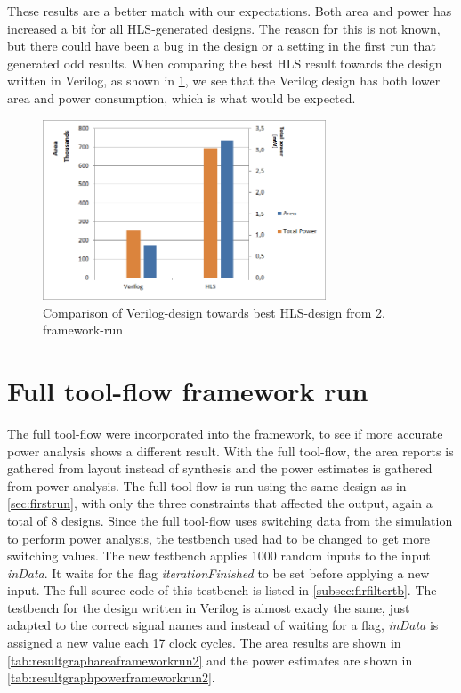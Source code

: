These results are a better match with our expectations. Both area and power has increased a bit for all HLS-generated designs. The reason for this is not known, but there could have been a bug in the design or a setting in the first run that generated odd results. When comparing the best HLS result towards the design written in Verilog, as shown in \cref{fig:resultcomparisonhlsrun2}, we see that the Verilog design has both lower area and power consumption, which is what would be expected.

\begin{figure}[hbpt]
\centering
\includegraphics[width=0.75\textwidth]{../figs/resultComparison2.png}
\caption{\label{fig:resultcomparisonhlsrun2}Comparison of Verilog-design towards best HLS-design from 2. framework-run}
\end{figure}

\section{\label{sec:fullflowresults}Full tool-flow framework run}
The full tool-flow were incorporated into the framework, to see if more accurate power analysis shows a different result. With the full tool-flow, the area reports is gathered from layout instead of synthesis and the power estimates is gathered from power analysis. The full tool-flow is run using the same design as in \cref{sec:firstrun}, with only the three constraints that affected the output, again a total of 8 designs. Since the full tool-flow uses switching data from the simulation to perform power analysis, the testbench used had to be changed to get more switching values. The new testbench applies 1000 random inputs to the input \textit{inData}. It waits for the flag \textit{iterationFinished} to be set before applying a new input. The full source code of this testbench is listed in \cref{subsec:firfiltertb}. The testbench for the design written in Verilog is almost exacly the same, just adapted to the correct signal names and instead of waiting for a flag, \textit{inData} is assigned a new value each 17 clock cycles. The area results are shown in \cref{tab:resultgraphareaframeworkrun2} and the power estimates are shown in \cref{tab:resultgraphpowerframeworkrun2}.


